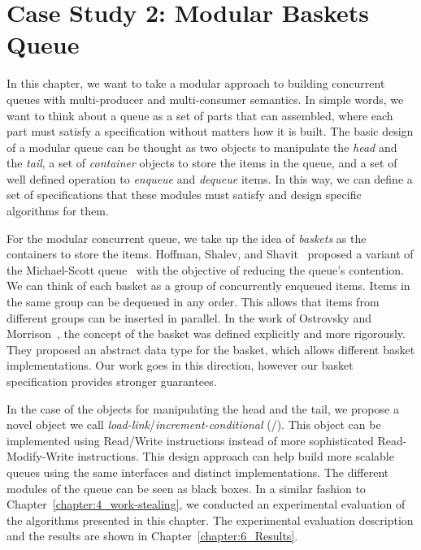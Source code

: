 \chapter{\label{chapter:5_modular-basket-queues}Case Study 2: Modular Baskets Queue}

In this chapter, we want to take a modular approach to building concurrent queues with multi-producer and multi-consumer semantics. In simple words, we want to think about a queue as a set of parts that can assembled, where each part must satisfy a specification without matters how it is built. The basic design of a modular queue can be thought as two objects to manipulate the \textit{head} and the \textit{tail}, a set of \textit{container} objects to store the items in the queue, and a set of well defined operation to \textit{enqueue} and \textit{dequeue} items. In this way, we can define a set of specifications that these modules must satisfy and design specific algorithms for them.

For the modular concurrent queue, we take up the idea of \textit{baskets} as the containers to store the items. Hoffman, Shalev, and Shavit~\cite{basketqueue2007} proposed a variant of the Michael-Scott queue~\cite{DBLP_conf_podc_MichaelS96} with the objective of reducing the queue’s \CAS contention. We can think of each basket as a group of concurrently enqueued items. Items in the same group can be dequeued in any order. This allows that items from different groups can be inserted in parallel. In the work of Ostrovsky and Morrison~\cite{scalingconcurrent2020}, the concept of the basket was defined explicitly and more rigorously. They proposed an abstract data type for the basket, which allows different basket implementations. Our work goes in this direction, however our basket specification provides stronger guarantees.

In the case of the objects for manipulating the head and the tail, we propose a novel object we call \textit{load-link}/\textit{increment-conditional} (\LL/\IC). This object can be implemented using Read/Write instructions instead of more sophisticated Read-Modify-Write instructions. This design approach can help build more scalable queues using the same interfaces and distinct implementations. The different modules of the queue can be seen as black boxes. In a similar fashion to Chapter~\ref{chapter:4_work-stealing}, we conducted an experimental evaluation of the algorithms presented in this chapter. The experimental evaluation description and the results are shown in Chapter~\ref{chapter:6_Results}.

